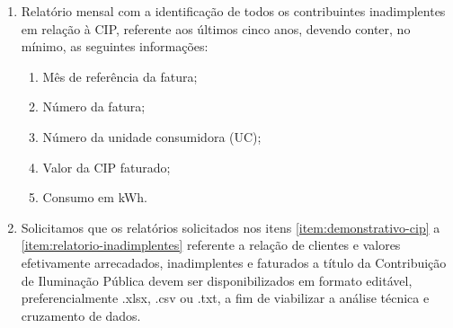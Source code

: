 \begin{enumerate}[resume]
\begin{enumerate}
  \item Mês de referência do faturamento associado;
  \item Número da fatura correspondente;
  \item Número da unidade consumidora (UC);
  \item Valor arrecadado;
  \item Data da arrecadação.
\end{enumerate}

\item Relatório mensal com a identificação de todos os contribuintes inadimplentes em relação à CIP, referente aos últimos cinco anos, devendo conter, no mínimo, as seguintes informações:
\label{item:relatorio-inadimplentes}

\begin{enumerate}
  \item Mês de referência da fatura;
  \item Número da fatura;
  \item Número da unidade consumidora (UC);
  \item Valor da CIP faturado;
  \item Consumo em kWh.
\end{enumerate}

\item Solicitamos que os relatórios solicitados nos itens \ref{item:demonstrativo-cip} a \ref{item:relatorio-inadimplentes} referente a relação de clientes e valores efetivamente arrecadados, inadimplentes e faturados a título da Contribuição de Iluminação Pública devem ser disponibilizados em formato editável, preferencialmente .xlsx, .csv ou .txt, a fim de viabilizar a análise técnica e cruzamento de dados.
\end{enumerate}

